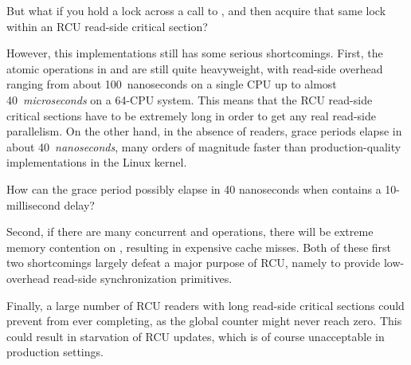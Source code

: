 \QuickQuiz{}
	But what if you hold a lock across a call to
	, and then acquire that same lock within
	an RCU read-side critical section?
 \QuickQuizEnd

However, this implementations still has some serious shortcomings.
First, the atomic operations in  and
 are still quite  heavyweight,
with read-side overhead ranging from about 100~nanoseconds on
a single  CPU up to almost 40~\emph{microseconds}
on a 64-CPU system.
This means that the RCU read-side critical sections
have to be extremely long in order to get any real
read-side parallelism.
On the other hand, in the absence of readers, grace periods elapse
in about 40~\emph{nanoseconds}, many orders of magnitude faster
than production-quality implementations in the Linux kernel.

\QuickQuiz{}
	How can the grace period possibly elapse in 40 nanoseconds when
	 contains a 10-millisecond delay?
 \QuickQuizEnd

Second, if there are many concurrent 
and  operations, there will
be extreme memory contention on ,
resulting in expensive cache misses.
Both of these first two shortcomings largely defeat a major purpose of
RCU, namely to provide low-overhead read-side synchronization primitives.

Finally, a large number of RCU readers with long read-side
critical sections could prevent 
from ever completing, as the global counter might
never reach zero.
This could result in starvation of RCU updates, which
is of course unacceptable in production settings.

